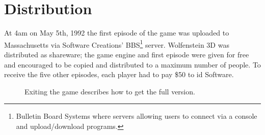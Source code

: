 \documentclass[book.tex]{subfiles}
\begin{document}
\section{Distribution}
At 4am on May 5th, 1992 the first episode of the game was uploaded to Massachusetts via Software Creations' BBS\footnote{Bulletin Board Systems where servers allowing users to connect via a console and upload/download programs.} server. Wolfenstein 3D was distributed as shareware; the game engine and first episode were given for free and encouraged to be copied and distributed to a maximum number of people. To receive the five other episodes, each player had to pay \$50 to id Software.\\
\par
\vspace{-10pt}
\begin{figure}[H]
\centering
 \caption{Exiting the game describes how to get the full version.}
 \end{figure}
\end{document}
